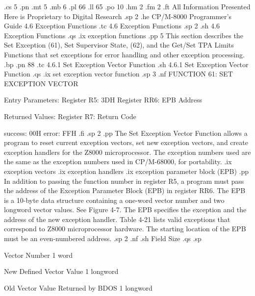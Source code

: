 .cs 5
.pn 
.mt 5
.mb 6
.pl 66
.ll 65
.po 10
.hm 2
.fm 2
.ft All Information Presented Here is Proprietary to Digital Research
.sp 2
.he CP/M-8000 Programmer's Guide              4.6  Exception Functions
.tc    4.6  Exception Functions
.sp 2
.sh
4.6  Exception Functions
.qs
.ix exception functions
.pp 5 
This section describes the Set Exception (61), Set Supervisor State, 
(62), and the Get/Set TPA Limits Functions that set exceptions for error
handling and other exception processing. 
.bp
.pn 88
.tc         4.6.1  Set Exception Vector Function
.sh
4.6.1  Set Exception Vector Function
.qs
.ix set exception vector function
.sp 3
.nf 
               FUNCTION 61:  SET EXCEPTION VECTOR

                Entry Parameters:
                   Register   R5:  3DH
                   Register  RR6:  EPB Address

                Returned  Values:
                   Register   R7:  Return Code

                                   success:  00H
                                     error:  FFH
.fi
.sp 2
.pp
The Set Exception Vector Function allows a program to reset
current exception vectors, set new exception vectors, and create
exception handlers for the Z8000 microprocessor. 
The exception numbers used are the same as the exception numbers 
used in CP/M-68000, for portability.
.ix exception vectors
.ix exception handlers
.ix exception parameter block (EPB)
.pp
In addition to passing the function number in register   R5, a
program must pass the address of the Exception Parameter Block
(EPB) in register  RR6. The EPB is a 10-byte data structure
containing a one-word vector number and two longword vector
values.  See Figure 4-7. The EPB specifies the exception and
the address of the new exception handler. 
Table 4-21 lists valid exceptions that correspond to Z8000 
microprocessor hardware.  The starting location of the 
EPB must be an even-numbered address.
.sp 2
.nf        
.sh
               Field                            Size
.qs
.sp              

             Vector Number                     1 word

             New Defined Vector Value          1 longword

           Old Vector Value Returned by BDOS   1 longword

